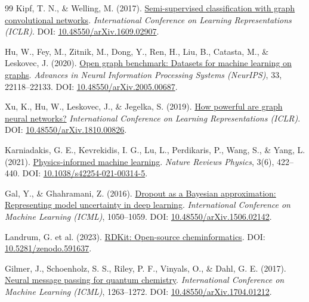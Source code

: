 \documentclass[11pt]{article}
\begin{document}
\begin{thebibliography}{99}
 Kipf, T. N., \& Welling, M. (2017). \href{https://openreview.net/forum?id=SJU4ayYgl}{Semi-supervised classification with graph convolutional networks}. \textit{International Conference on Learning Representations (ICLR)}. DOI: \href{https://doi.org/10.48550/arXiv.1609.02907}{10.48550/arXiv.1609.02907}.

 Hu, W., Fey, M., Zitnik, M., Dong, Y., Ren, H., Liu, B., Catasta, M., \& Leskovec, J. (2020). \href{https://proceedings.neurips.cc/paper/2020/hash/fb60d411a5c5b72b2e7d3527cfc84fd0-Abstract.html}{Open graph benchmark: Datasets for machine learning on graphs}. \textit{Advances in Neural Information Processing Systems (NeurIPS)}, 33, 22118--22133. DOI: \href{https://doi.org/10.48550/arXiv.2005.00687}{10.48550/arXiv.2005.00687}.

 Xu, K., Hu, W., Leskovec, J., \& Jegelka, S. (2019). \href{https://openreview.net/forum?id=ryGs6iA5Km}{How powerful are graph neural networks?} \textit{International Conference on Learning Representations (ICLR)}. DOI: \href{https://doi.org/10.48550/arXiv.1810.00826}{10.48550/arXiv.1810.00826}.

 Karniadakis, G. E., Kevrekidis, I. G., Lu, L., Perdikaris, P., Wang, S., \& Yang, L. (2021). \href{https://doi.org/10.1038/s42254-021-00314-5}{Physics-informed machine learning}. \textit{Nature Reviews Physics}, 3(6), 422--440. DOI: \href{https://doi.org/10.1038/s42254-021-00314-5}{10.1038/s42254-021-00314-5}.

 Gal, Y., \& Ghahramani, Z. (2016). \href{https://proceedings.mlr.press/v48/gal16.html}{Dropout as a Bayesian approximation: Representing model uncertainty in deep learning}. \textit{International Conference on Machine Learning (ICML)}, 1050--1059. DOI: \href{https://doi.org/10.48550/arXiv.1506.02142}{10.48550/arXiv.1506.02142}.

 Landrum, G. et al. (2023). \href{https://www.rdkit.org}{RDKit: Open-source cheminformatics}. DOI: \href{https://doi.org/10.5281/zenodo.591637}{10.5281/zenodo.591637}.

 Gilmer, J., Schoenholz, S. S., Riley, P. F., Vinyals, O., \& Dahl, G. E. (2017). \href{https://proceedings.mlr.press/v70/gilmer17a.html}{Neural message passing for quantum chemistry}. \textit{International Conference on Machine Learning (ICML)}, 1263--1272. DOI: \href{https://doi.org/10.48550/arXiv.1704.01212}{10.48550/arXiv.1704.01212}.


\end{thebibliography}
\end{document}
